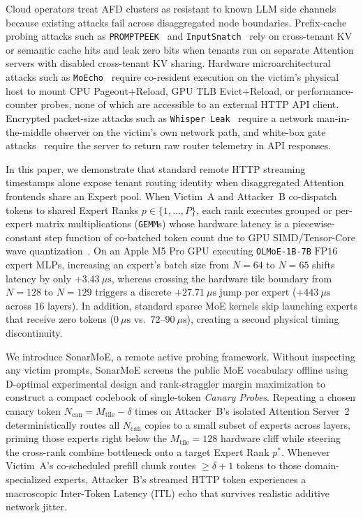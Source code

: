 \documentclass[final,5p,times,twocolumn]{elsarticle}
\def\SM{SonarMoE}%
\theoremstyle{definition}
\theoremstyle{remark}
\newcommand{\SM}{\textsc{SonarMoE}}
\begin{document}
Cloud operators treat AFD clusters as resistant to known LLM side channels because existing attacks fail across disaggregated node boundaries. Prefix-cache probing attacks such as \texttt{PROMPTPEEK}~\cite{wu2025promptpeek} and \texttt{InputSnatch}~\cite{zheng2025inputsnatch} rely on cross-tenant KV or semantic cache hits and leak zero bits when tenants run on separate Attention servers with disabled cross-tenant KV sharing. Hardware microarchitectural attacks such as \texttt{MoEcho}~\cite{ding2025moecho} require co-resident execution on the victim's physical host to mount CPU Pageout+Reload, GPU TLB Evict+Reload, or performance-counter probes, none of which are accessible to an external HTTP API client. Encrypted packet-size attacks such as \texttt{Whisper Leak}~\cite{microsoft2025whisperleak} require a network man-in-the-middle observer on the victim's own network path, and white-box gate attacks~\cite{patel2026routingmembership} require the server to return raw router telemetry in API responses.

In this paper, we demonstrate that standard remote HTTP streaming timestamps alone expose tenant routing identity when disaggregated Attention frontends share an Expert pool. When Victim~A and Attacker~B co-dispatch tokens to shared Expert Ranks $p \in \{1, \dots, P\}$, each rank executes grouped or per-expert matrix multiplications (\texttt{GEMM}s) whose hardware latency is a piecewise-constant step function of co-batched token count due to GPU SIMD/Tensor-Core wave quantization~\cite{gale2023megablocks,tan2025gpugemmcliff}. On an Apple M5 Pro GPU executing \texttt{OLMoE-1B-7B} $\mathrm{FP16}$ expert MLPs, increasing an expert's batch size from $N=64$ to $N=65$ shifts latency by only $+3.43~\mu\mathrm{s}$, whereas crossing the hardware tile boundary from $N=128$ to $N=129$ triggers a discrete $+27.71~\mu\mathrm{s}$ jump per expert ($+443~\mu\mathrm{s}$ across $16$ layers). In addition, standard sparse MoE kernels skip launching experts that receive zero tokens ($0~\mu\mathrm{s}$ vs.\ $72$--$90~\mu\mathrm{s}$), creating a second physical timing discontinuity.

We introduce \SM{}, a remote active probing framework. Without inspecting any victim prompts, \SM{} screens the public MoE vocabulary offline using D-optimal experimental design and rank-straggler margin maximization to construct a compact codebook of single-token \emph{Canary Probes}. Repeating a chosen canary token $N_{\mathrm{can}} = M_{\mathrm{tile}} - \delta$ times on Attacker~B's isolated Attention Server~2 deterministically routes all $N_{\mathrm{can}}$ copies to a small subset of experts across layers, priming those experts right below the $M_{\mathrm{tile}} = 128$ hardware cliff while steering the cross-rank combine bottleneck onto a target Expert Rank $p^*$. Whenever Victim~A's co-scheduled prefill chunk routes $\ge \delta + 1$ tokens to those domain-specialized experts, Attacker~B's streamed HTTP token experiences a macroscopic Inter-Token Latency ($\mathrm{ITL}$) echo that survives realistic additive network jitter.
\end{document}
